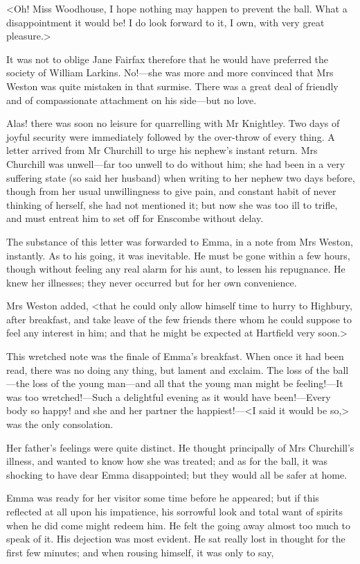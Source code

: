 <Oh! Miss Woodhouse, I hope nothing may happen to prevent the ball. What a disappointment it would be! I do look forward to it, I own, with very great pleasure.>

It was not to oblige Jane Fairfax therefore that he would have preferred the society of William Larkins. No!—she was more and more convinced that Mrs Weston was quite mistaken in that surmise. There was a great deal of friendly and of compassionate attachment on his side—but no love.

Alas! there was soon no leisure for quarrelling with Mr Knightley. Two days of joyful security were immediately followed by the over-throw of every thing. A letter arrived from Mr Churchill to urge his nephew's instant return. Mrs Churchill was unwell—far too unwell to do without him; she had been in a very suffering state (so said her husband) when writing to her nephew two days before, though from her usual unwillingness to give pain, and constant habit of never thinking of herself, she had not mentioned it; but now she was too ill to trifle, and must entreat him to set off for Enscombe without delay.

The substance of this letter was forwarded to Emma, in a note from Mrs Weston, instantly. As to his going, it was inevitable. He must be gone within a few hours, though without feeling any real alarm for his aunt, to lessen his repugnance. He knew her illnesses; they never occurred but for her own convenience.

Mrs Weston added, <that he could only allow himself time to hurry to Highbury, after breakfast, and take leave of the few friends there whom he could suppose to feel any interest in him; and that he might be expected at Hartfield very soon.>

This wretched note was the finale of Emma's breakfast. When once it had been read, there was no doing any thing, but lament and exclaim. The loss of the ball—the loss of the young man—and all that the young man might be feeling!—It was too wretched!—Such a delightful evening as it would have been!—Every body so happy! and she and her partner the happiest!—<I said it would be so,> was the only consolation.

Her father's feelings were quite distinct. He thought principally of Mrs Churchill's illness, and wanted to know how she was treated; and as for the ball, it was shocking to have dear Emma disappointed; but they would all be safer at home.

Emma was ready for her visitor some time before he appeared; but if this reflected at all upon his impatience, his sorrowful look and total want of spirits when he did come might redeem him. He felt the going away almost too much to speak of it. His dejection was most evident. He sat really lost in thought for the first few minutes; and when rousing himself, it was only to say,


